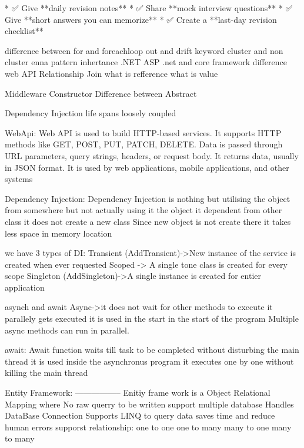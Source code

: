 * ✅ Give **daily revision notes**
* ✅ Share **mock interview questions**
* ✅ Give **short answers you can memorize**
* ✅ Create a **last-day revision checklist**


difference between for and foreachloop
out and drift keyword
cluster and non cluster
enna pattern 
inhertance 
.NET
ASP
.net and core framework difference
web API
Relationship
Join
what is refference what is value


Middleware
Constructor
Difference between Abstract

Dependency Injection
life spans
loosely coupled 


WebApi:
        Web API is used to build HTTP-based services.
        It supports HTTP methods like GET, POST, PUT, PATCH, DELETE.
        Data is passed through URL parameters, query strings, headers, or request body.
        It returns data, usually in JSON format.
        It is used by web applications, mobile applications, and other systems

Dependency Injection:
                    Dependency Injection is nothing but utilising the object from somewhere but not actually using it
                    the object it dependent from other class
                    it does not create a new class 
                    Since new object is not create there it takes less space in memory location

we have 3 types of DI:
                    Transient (AddTransient)->New instance of the service is created when ever requested
                    Scoped -> A single tone class is created for every scope
                    Singleton (AddSingleton)->A single instance is created for entier application


asynch and await
                    Async->it does not wait for other methods to execute it parallely gets executed
                    it is used in the start in the start of the program
                    Multiple async methods can run in parallel.



await:
                    Await function waits till task to be completed without disturbing the main thread
                    it is used inside the asynchronus program
                    it executes one by one without killing the main thread

Entity Framework:
-----------------
                    Enitiy frame work is a Object Relational Mapping
                    where No raw querry to be written 
                    support multiple database
                    Handles DataBase Connection
                    Supports LINQ to query data
                    saves time and reduce human errors
                    supporst relationship:
                    one to one 
                    one to many
                    many to one
                    many to many
                    

